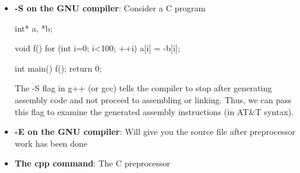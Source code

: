 \documentclass{report}
\begin{document}
        \pagebreak 
        \begin{itemize}
            \item \textbf{-S on the GNU compiler}: Consider a C program
                \bigbreak \noindent 
                \begin{cppcode}
                    int* a, *b;

                    void f() {
                        for (int i=0; i<100; ++i) {
                            a[i] = -b[i];
                        }
                    }

                    int main() {
                        f();
                        return 0;
                    }
                \end{cppcode}
                \bigbreak \noindent 
                The -S flag in g++ (or gcc) tells the compiler to stop after generating assembly code and not proceed to assembling or linking. Thus, we can pass this flag to examine the generated assembly instructions (in AT\&T syntax).
            \item \textbf{-E on the GNU compiler}: Will give you the source file after preprocessor work has been done
            \item \textbf{The cpp command}: The C preprocessor
        \end{itemize}

        \pagebreak 
\end{document}
